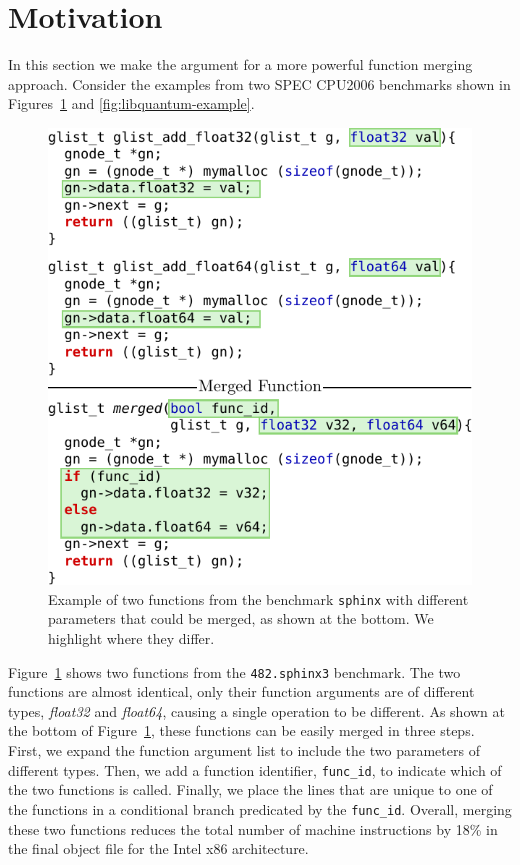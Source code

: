 \section{Motivation} \label{sec:motivation}

In this section we make the argument for a more powerful function merging
approach. Consider the examples from two SPEC CPU2006 benchmarks shown in
Figures~\ref{fig:sphinx-example} and \ref{fig:libquantum-example}.

\begin{figure}[t!]
  \centering
  \includegraphics[width=.95\linewidth]{figs/sphinx-example.pdf}
  \caption{Example of two functions from the benchmark \texttt{sphinx} with
	different parameters that could be merged, as shown at the bottom.
    We highlight where they differ.}
  \label{fig:sphinx-example}
\end{figure}

Figure~\ref{fig:sphinx-example} shows two functions from the
\texttt{482.sphinx3} benchmark. The two functions are almost identical, only
their function arguments are of different types, \textit{float32} and
\textit{float64}, causing a single operation to be different. As shown at the
bottom of Figure~\ref{fig:sphinx-example}, these functions can be easily merged
in three steps. First, we expand the function argument list to include the
two parameters of different types. Then, we add a function identifier,
\texttt{func\_id}, to indicate which of the two functions is called. Finally,
we place the lines that are unique to one of the functions in
a conditional branch predicated by the \texttt{func\_id}.
Overall, merging these two functions reduces the total number of machine
instructions by 18\% in the final object file for the Intel x86 architecture.

